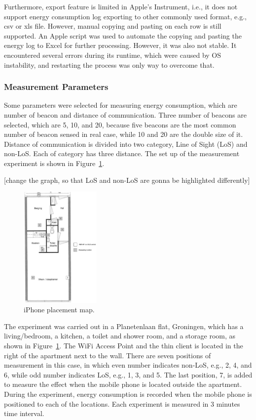 \documentclass[journal]{vgtc}                %
\begin{document}
Furthermore, export feature is limited in Apple's Instrument, i.e., it does not support energy consumption log exporting to other commonly used format, e.g., csv or xls file. However, manual copying and pasting on each row is still supported. An Apple script was used to automate the copying and pasting the energy log to Excel for further processing. However, it was also not stable. It encountered several errors during its runtime, which were caused by OS instability, and restarting the process was only way to overcome that.

\subsubsection{Measurement Parameters} %
\label{ssub:measurement_parameters}
Some parameters were selected for measuring energy consumption, which are number of beacon and distance of communication. Three number of beacons are selected, which are 5, 10, and 20, because five beacons are the most common number of beacon sensed in real case, while 10 and 20 are the double size of it. Distance of communication is divided into two category, Line of Sight (LoS) and non-LoS. Each of category has three distance. The set up of the measurement experiment is shown in Figure~\ref{fig:experiment-map}.

[change the graph, so that LoS and non-LoS are gonna be highlighted differently]
\begin{figure}
  \centering
    \includegraphics[width=0.35\textwidth]{experiment-map}
  \caption{iPhone placement map.}
  \label{fig:experiment-map}
\end{figure}

The experiment was carried out in a Planetenlaan flat, Groningen, which has a living/bedroom, a kitchen, a toilet and shower room, and a storage room, as shown in Figure~\ref{fig:experiment-map}. The WiFi Access Point and the thin client is located in the right of the apartment next to the wall. There are seven positions of measurement in this case, in which even number indicates non-LoS, e.g., 2, 4, and 6, while odd number indicates LoS, e.g., 1, 3, and 5. The last position, 7, is added to measure the effect when the mobile phone is located outside the apartment. During the experiment, energy consumption is recorded when the mobile phone is positioned to each of the locations. Each experiment is measured in 3 minutes time interval.
\end{document}
